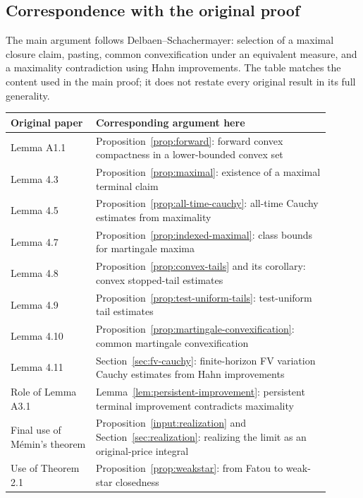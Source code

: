 \subsection{Correspondence with the original proof}
\label{sec:original-proof}
The main argument follows Delbaen--Schachermayer\cite[Section 4]{DS}:
selection of a maximal closure claim, pasting, common convexification under
an equivalent measure, and a maximality contradiction using Hahn improvements.
The table matches the content used in the main proof; it does not restate
every original result in its full generality.

\begin{center}
\small
\begin{tabular}{L{0.24\linewidth}L{0.66\linewidth}}
\toprule
Original paper & Corresponding argument here \\
\midrule
Lemma A1.1 & Proposition~\ref{prop:forward}: forward convex compactness in a lower-bounded convex set \\
Lemma 4.3 & Proposition~\ref{prop:maximal}: existence of a maximal terminal claim \\
Lemma 4.5 & Proposition~\ref{prop:all-time-cauchy}: all-time Cauchy estimates from maximality \\
Lemma 4.7 & Proposition~\ref{prop:indexed-maximal}: class bounds for martingale maxima \\
Lemma 4.8 & Proposition~\ref{prop:convex-tails} and its corollary: convex stopped-tail estimates \\
Lemma 4.9 & Proposition~\ref{prop:test-uniform-tails}: test-uniform tail estimates \\
Lemma 4.10 & Proposition~\ref{prop:martingale-convexification}: common martingale convexification \\
Lemma 4.11 & Section~\ref{sec:fv-cauchy}: finite-horizon FV variation Cauchy estimates from Hahn improvements \\
Role of Lemma A3.1 & Lemma~\ref{lem:persistent-improvement}: persistent terminal improvement contradicts maximality \\
Final use of M\'emin's theorem & Proposition~\ref{input:realization} and Section~\ref{sec:realization}: realizing the limit as an original-price integral \\
Use of Theorem 2.1 & Proposition~\ref{prop:weakstar}: from Fatou to weak-star closedness \\
\bottomrule
\end{tabular}
\end{center}

